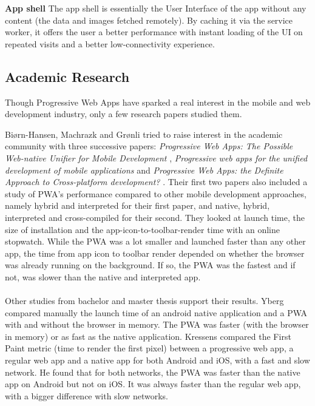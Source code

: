 \documentclass{kththesis}
\begin{document}
\medskip
\textbf{App shell} \newline
The app shell is essentially the User Interface of the app without any content \cite{AppShell_def} (the data and images fetched remotely). By caching it via the service worker, it offers the user a better performance with instant loading of the UI on repeated visits and a better low-connectivity experience.

\subsection{Academic Research} 

Though Progressive Web Apps have sparked a real interest in the mobile and web development industry, only a few research papers studied them\cite{PWApossibleUnifer, Biorn-Hansen2, Biorn-Hansen3}.

Biørn-Hansen, Machrazk and Grønli tried to raise interest in the academic community with three successive papers: \textit{Progressive Web Apps: The Possible Web-native Unifier for Mobile Development} \cite{PWApossibleUnifer}, \textit{Progressive web apps for the unified development of mobile applications} \cite{Biorn-Hansen2} and \textit{Progressive Web Apps: the Definite Approach to Cross-platform development?} \cite{Biorn-Hansen3}. Their first two papers also included a study of PWA's performance compared to other mobile development approaches, namely hybrid and interpreted for their first paper, and native, hybrid, interpreted and cross-compiled for their second. They looked at launch time, the size of installation and the app-icon-to-toolbar-render time with an online stopwatch. While the PWA was a lot smaller and launched faster than any other app, the time from app icon to toolbar render depended on whether the browser was already running on the background. If so, the PWA was the fastest and if not, was slower than the native and interpreted app. 

\paragraph{}
Other studies from bachelor and master thesis support their results. Yberg \cite{YbergViktor2018NPaU} compared manually the launch time of an android native application and a PWA with and without the browser in memory. The PWA was faster (with the browser in memory) or as fast as the native application. Kressens \cite{PWAapplicability} compared the First Paint metric (time to render the first pixel) between a progressive web app, a regular web app and a native app for both Android and iOS, with a fast and slow network. He found that for both networks, the PWA was faster than the native app on Android but not on iOS. It was always faster than the regular web app, with a bigger difference with slow networks.
\end{document}
